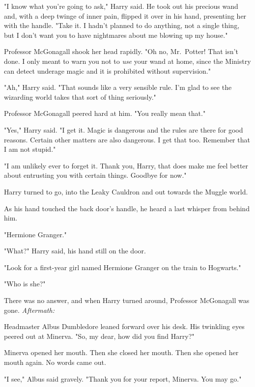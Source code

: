 "I know what you're going to ask," Harry said. He took out his precious wand 
and, with a deep twinge of inner pain, flipped it over in his hand, presenting 
her with the handle. "Take it. I hadn't planned to do anything, not a single 
thing, but I don't want you to have nightmares about me blowing up my house."

Professor McGonagall shook her head rapidly. "Oh no, Mr.~Potter! That isn't 
done. I only meant to warn you not to \emph{use} your wand at home, since the 
Ministry can detect underage magic and it is prohibited without supervision."

"Ah," Harry said. "That sounds like a very sensible rule. I'm glad to see the 
wizarding world takes that sort of thing seriously."

Professor McGonagall peered hard at him. "You really mean that."

"Yes," Harry said. "I get it. Magic is dangerous and the rules are there for 
good reasons. Certain other matters are also dangerous. I get that too. 
Remember that I am not stupid."

"I am unlikely ever to forget it. Thank you, Harry, that does make me feel 
better about entrusting you with certain things. Goodbye for now."

Harry turned to go, into the Leaky Cauldron and out towards the Muggle world.

As his hand touched the back door's handle, he heard a last whisper from behind 
him.

"Hermione Granger."

"What?" Harry said, his hand still on the door.

"Look for a first-year girl named Hermione Granger on the train to Hogwarts."

"Who is she?"

There was no answer, and when Harry turned around, Professor McGonagall was 
gone.
\sbreak
\emph{Aftermath:}

Headmaster Albus Dumbledore leaned forward over his desk. His twinkling eyes 
peered out at Minerva. "So, my dear, how did you find Harry?"

Minerva opened her mouth. Then she closed her mouth. Then she opened her mouth 
again. No words came out.

"I see," Albus said gravely. "Thank you for your report, Minerva. You may go."
